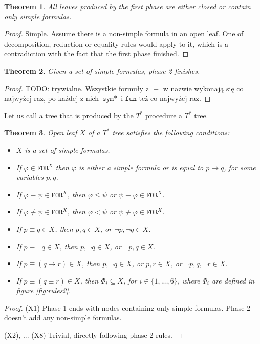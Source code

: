 \documentclass{article}
\newtheorem{theorem}{Theorem}
\theoremstyle{definition}
\newcommand*{\Ts}{T^*}
\newcommand*{\eq}{\equiv}
\newcommand*{\ra}{\rightarrow}
\newcommand*{\FOR}{\texttt{FOR}}
\begin{document}
\begin{theorem}
    All leaves produced by the first phase are either closed or contain only simple formulas.
\end{theorem}
\begin{proof}
    Simple. Assume there is a non-simple formula in an open leaf. One of decomposition, reduction or equality rules would apply to it, which is a contradiction with the fact that the first phase finished.
\end{proof}

\begin{theorem}
    Given a set of simple formulas, phase 2 finishes.
\end{theorem}
\begin{proof}
    TODO: trywialne. Wszystkie formuły z $\eq$ w nazwie wykonają się co najwyżej raz, po każdej z nich $\texttt{sym}*$ i $\texttt{fun}$ też co najwyżej raz. 
\end{proof}

Let us call a tree that is produced by the $\Ts$ procedure a $\Ts$ tree.

\begin{theorem}
    Open leaf $X$ of a $\Ts$ tree satisfies the following conditions:
    \begin{itemize}
        \item [(X1)] $X$ is a set of simple formulas.
        \item [(X2)] If $\varphi \in \FOR^X$ then $\varphi$ is either a simple formula or is equal to $p \ra q$, for some variables $p, q$.
        \item [(X3)] If $\varphi \eq \psi \in \FOR^X$, then $\varphi \leq \psi$ or $\psi \eq \varphi \in \FOR^X$.
        \item [(X4)] If $\varphi \not \eq \psi \in \FOR^X$, then $\varphi < \psi$ or $\psi \not \eq \varphi \in \FOR^X$.
        \item [(X5)] If $p \eq q \in X$, then $p, q \in X$, or $\lnot p, \lnot q \in X$.
        \item [(X6)] If $p \eq \lnot q \in X$, then $p, \lnot q \in X$, or $\lnot p, q \in X$.
        \item [(X7)] If $p \eq (q \ra r) \in X$, then $p, \lnot q \in X$, or $p, r \in X$, or $\lnot p, q, \lnot r \in X$.
        \item [(X8)] If $p \eq (q \eq r) \in X$, then $\Phi_i \subseteq X$, for $i \in \{1, ..., 6\}$, where $\Phi_i$ are defined in figure \ref{fig:rules2}.
    \end{itemize}
\end{theorem}
\begin{proof}
        (X1) Phase 1 ends with nodes containing only simple formulas. Phase 2 doesn't add any non-simple formulas.

        (X2), ... (X8) Trivial, directly following phase 2 rules.
\end{proof}
\end{document}
